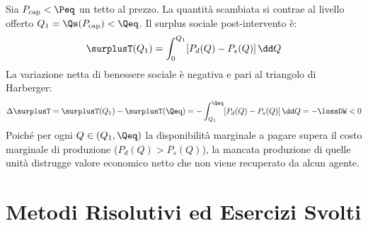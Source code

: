 \begin{dimostrazione}
Sia $P_{\text{cap}} < \Peq$ un tetto al prezzo. La quantità scambiata si contrae al livello offerto $Q_1 = \Qs(P_{\text{cap}}) < \Qeq$.
Il surplus sociale post-intervento è:
\begin{equation}
    \surplusT(Q_1) = \int_0^{Q_1} [ P_d(Q) - P_s(Q) ] \, \dd Q
\end{equation}
La variazione netta di benessere sociale è negativa e pari al triangolo di Harberger:
\begin{equation}
    \Delta \surplusT = \surplusT(Q_1) - \surplusT(\Qeq) = - \int_{Q_1}^{\Qeq} [ P_d(Q) - P_s(Q) ] \, \dd Q = - \lossDW < 0
\end{equation}
Poiché per ogni $Q \in (Q_1, \Qeq)$ la disponibilità marginale a pagare supera il costo marginale di produzione ($P_d(Q) > P_s(Q)$), la mancata produzione di quelle unità distrugge valore economico netto che non viene recuperato da alcun agente.
\end{dimostrazione}

\section{Metodi Risolutivi ed Esercizi Svolti}

